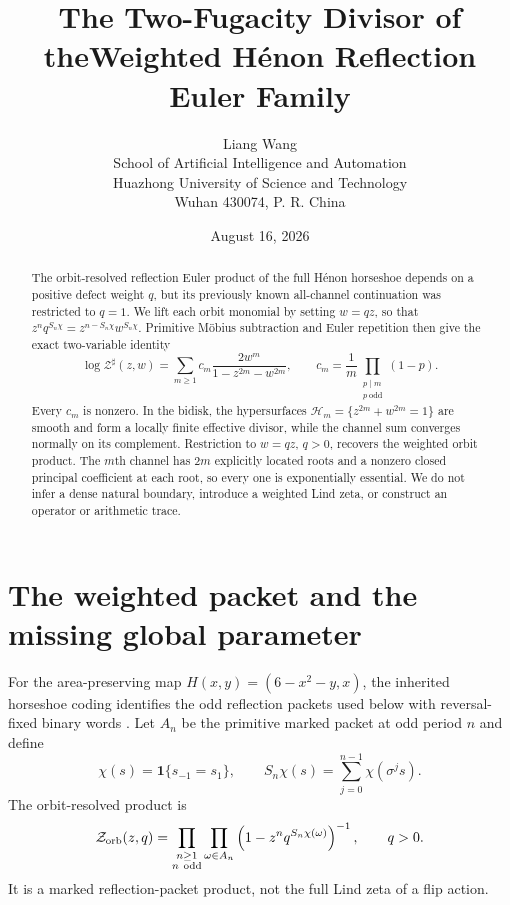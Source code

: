 \documentclass[11pt]{article}
\title{The Two-Fugacity Divisor of the\linebreak Weighted H\'enon Reflection Euler Family}
\author{Liang Wang\\\small School of Artificial Intelligence and Automation\\\small Huazhong University of Science and Technology\\\small Wuhan 430074, P. R. China}
\date{August 16, 2026}
\newcommand{\Zorb}{\mathcal Z_{\rm orb}}
\begin{document}
\maketitle

\begin{abstract}
The orbit-resolved reflection Euler product of the full H\'enon horseshoe
depends on a positive defect weight $q$, but its previously known
all-channel continuation was restricted to $q=1$.  We lift each orbit
monomial by setting $w=qz$, so that
$z^nq^{S_n\chi}=z^{n-S_n\chi}w^{S_n\chi}$.  Primitive M\"obius subtraction
and Euler repetition then give the exact two-variable identity
\[
 \log\mathcal Z^{\sharp}(z,w)
 =\sum_{m\ge1}c_m\frac{2w^m}{1-z^{2m}-w^{2m}},\qquad
 c_m=\frac1m\prod_{\substack{p\mid m\\p\ \mathrm{odd}}}(1-p).
\]
Every $c_m$ is nonzero.  In the bidisk, the hypersurfaces
$\mathcal H_m=\{z^{2m}+w^{2m}=1\}$ are smooth and form a locally finite
effective divisor, while the channel sum converges normally on its
complement.  Restriction to $w=qz$, $q>0$, recovers the weighted orbit
product.  The $m$th channel has $2m$ explicitly located roots and a nonzero
closed principal coefficient at each root, so every one is exponentially
essential.  We do not infer a dense natural boundary, introduce a weighted
Lind zeta, or construct an operator or arithmetic trace.
\end{abstract}

\section{The weighted packet and the missing global parameter}

For the area-preserving map $H(x,y)=(6-x^2-y,x)$, the inherited horseshoe
coding identifies the odd reflection packets used below with
reversal-fixed binary words \citep{DevaneyNitecki1979,Arai2007}.  Let
$A_n$ be the primitive marked packet at odd period $n$ and define
\[
 \chi(s)=\mathbf 1\{s_{-1}=s_1\},\qquad
 S_n\chi(s)=\sum_{j=0}^{n-1}\chi(\sigma^js).
\]
The orbit-resolved product is
\begin{equation}\label{eq:original-product}
 \Zorb(z,q)=\prod_{\substack{n\ge1\\n\ \mathrm{odd}}}
 \prod_{\omega\in A_n}
 \left(1-z^nq^{S_n\chi(\omega)}\right)^{-1},\qquad q>0.
\end{equation}
It is a marked reflection-packet product, not the full Lind zeta of a flip
action.
\end{document}
